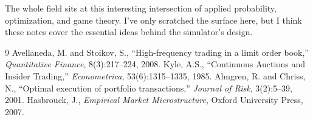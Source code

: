 \documentclass[11pt]{article}
\begin{document}
The whole field sits at this interesting intersection of applied probability, optimization, and game theory. I've only scratched the surface here, but I think these notes cover the essential ideas behind the simulator's design.

\begin{thebibliography}{9}
 Avellaneda, M. and Stoikov, S., ``High-frequency trading in a limit order book,'' \textit{Quantitative Finance}, 8(3):217--224, 2008.
 Kyle, A.S., ``Continuous Auctions and Insider Trading,'' \textit{Econometrica}, 53(6):1315--1335, 1985.
 Almgren, R. and Chriss, N., ``Optimal execution of portfolio transactions,'' \textit{Journal of Risk}, 3(2):5--39, 2001.
 Hasbrouck, J., \textit{Empirical Market Microstructure}, Oxford University Press, 2007.
\end{thebibliography}
\end{document}
